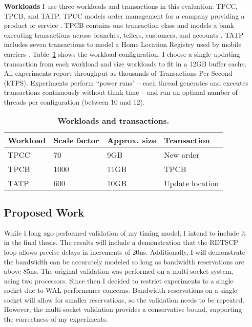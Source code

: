 \textbf{Workloads}
I use three workloads and transactions in this evaluation: TPCC, TPCB, and TATP.
TPCC models order management for a company providing a product or service \cite{TPCC}.
TPCB contains one transaction class and models a bank executing transactions across branches, tellers, customers, and accounts \cite{TPCB}.
TATP includes seven transactions to model a Home Location Registry used by mobile carriers \cite{TATP}.
Table~\ref{table::Workloads} shows the workload configuration.
I choose a single updating transaction from each workload and size workloads to fit in a 12GB buffer cache.
All experiments report throughput as thousands of Transactions Per Second (kTPS).
Experiments perform ``power runs" -- each thread generates and executes transactions continuously without think time -- and run an optimal number of threads per configuration (between 10 and 12).

\begin{table}
  \centering
  \begin{tabular}{l l l l}
    \hline
    Workload & Scale factor & Approx. size & Transaction \\
    \hline \hline
    TPCC & 70 & 9GB & New order \\
    TPCB & 1000 & 11GB & TPCB \\
    TATP & 600 & 10GB & Update location \\
    \hline
  \end{tabular}
  \caption{\textbf{Workloads and transactions.}}
  \label{table::Workloads}
\end{table}

\subsection{Proposed Work}
\label{sec:OLTP_design:Methodology:Proposed}

While I long ago performed validation of my timing model, I intend to include it in the final thesis.
The results will include a demonstration that the RDTSCP loop allows precise delays in increments of 20ns.
Additionally, I will demonstrate the bandwidth can be accurately modeled so long as bandwidth reservations are above 85ns.
The original validation was performed on a multi-socket system, using two processors.
Since then I decided to restrict experiments to a single socket due to WAL performance concerns.
Bandwidth reservations on a single socket will allow for smaller reservations, so the validation needs to be repeated.
However, the multi-socket validation provides a conservative bound, supporting the correctness of my experiments.


